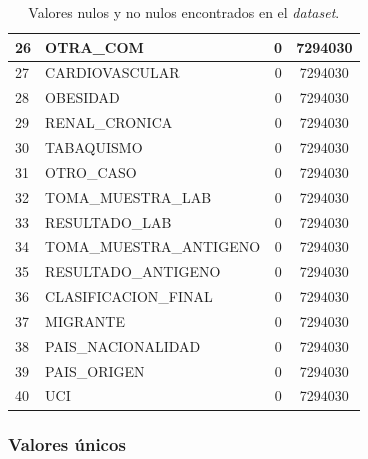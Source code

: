 \begin{table}[h]
{\begin{tabular}{|l|l|c|c|}
26 & OTRA\_COM               & 0 & 7294030 \\ \hline
27 & CARDIOVASCULAR          & 0 & 7294030 \\ \hline
28 & OBESIDAD                & 0 & 7294030 \\ \hline
29 & RENAL\_CRONICA          & 0 & 7294030 \\ \hline
30 & TABAQUISMO              & 0 & 7294030 \\ \hline
31 & OTRO\_CASO              & 0 & 7294030 \\ \hline
32 & TOMA\_MUESTRA\_LAB      & 0 & 7294030 \\ \hline
33 & RESULTADO\_LAB          & 0 & 7294030 \\ \hline
34 & TOMA\_MUESTRA\_ANTIGENO & 0 & 7294030 \\ \hline
35 & RESULTADO\_ANTIGENO     & 0 & 7294030 \\ \hline
36 & CLASIFICACION\_FINAL    & 0 & 7294030 \\ \hline
37 & MIGRANTE                & 0 & 7294030 \\ \hline
38 & PAIS\_NACIONALIDAD      & 0 & 7294030 \\ \hline
39 & PAIS\_ORIGEN            & 0 & 7294030 \\ \hline
40 & UCI                     & 0 & 7294030 \\ \hline
\end{tabular}
}
\caption{Valores nulos y no nulos encontrados en el \emph{dataset}.}
\label{tabla:isnull}
\end{table}

\clearpage
\subsubsection{Valores únicos}

